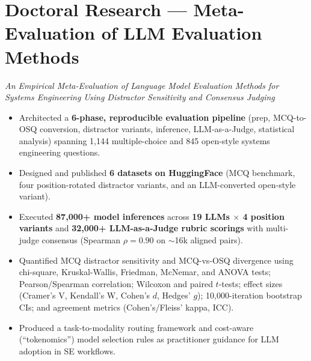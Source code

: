 \documentclass[10pt,letterpaper]{article}
\begin{document}
\section{Doctoral Research --- Meta-Evaluation of LLM Evaluation Methods}
\textit{\small An Empirical Meta-Evaluation of Language Model Evaluation Methods for Systems
Engineering Using Distractor Sensitivity and Consensus Judging}
\begin{itemize}
  \item Architected a \textbf{6-phase, reproducible evaluation pipeline} (prep, MCQ-to-OSQ
        conversion, distractor variants, inference, LLM-as-a-Judge, statistical analysis)
        spanning 1{,}144 multiple-choice and 845 open-style systems engineering questions.
  \item Designed and published \textbf{6 datasets on HuggingFace} (MCQ benchmark, four
        position-rotated distractor variants, and an LLM-converted open-style variant).
  \item Executed \textbf{87{,}000+ model inferences} across \textbf{19 LLMs $\times$ 4 position
        variants} and \textbf{32{,}000+ LLM-as-a-Judge rubric scorings} with multi-judge
        consensus (Spearman $\rho = 0.90$ on $\sim$16k aligned pairs).
  \item Quantified MCQ distractor sensitivity and MCQ-vs-OSQ divergence using chi-square,
        Kruskal-Wallis, Friedman, McNemar, and ANOVA tests; Pearson/Spearman correlation;
        Wilcoxon and paired $t$-tests; effect sizes (Cramer's V, Kendall's W, Cohen's $d$,
        Hedges' $g$); 10{,}000-iteration bootstrap CIs; and agreement metrics (Cohen's/Fleiss'
        kappa, ICC).
  \item Produced a task-to-modality routing framework and cost-aware (``tokenomics'') model
        selection rules as practitioner guidance for LLM adoption in SE workflows.
\end{itemize}

\end{document}
